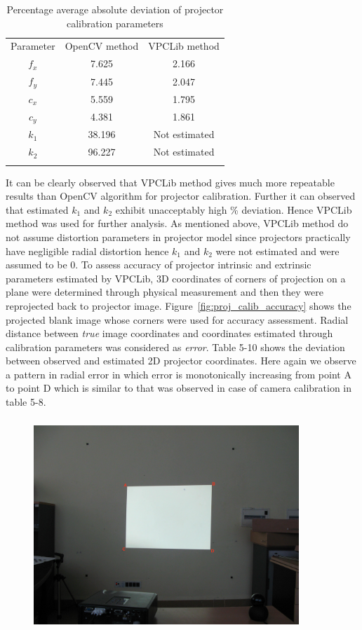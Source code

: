 \begin{enumerate}
\begin{table}[ht]
\centering
\begin{tabular}{c c c}
\hline\noalign{\smallskip}
Parameter  & OpenCV method & VPCLib method \\
\noalign{\smallskip}\hline\noalign{\smallskip}
$f_x$ & 7.625 & 2.166\\
$f_y$ & 7.445 & 2.047\\
$c_x$ & 5.559 & 1.795\\
$c_y$ & 4.381 & 1.861\\
$k_1$ & 38.196 & Not estimated\\
$k_2$ & 96.227 & Not estimated\\
\noalign{\smallskip}\hline
\end{tabular}
\caption{Percentage average absolute deviation of projector calibration parameters}
\end{table}
It can be clearly observed that VPCLib method gives much more repeatable results than OpenCV algorithm for projector calibration. Further it can observed that estimated $k_1$ and $k_2$ exhibit unacceptably high \% deviation. Hence VPCLib method was used for further analysis.\newline
\indent
As mentioned above, VPCLib method do not assume distortion parameters in projector model since projectors practically have negligible radial distortion hence $k_1$ and $k_2$ were not estimated and were assumed to be 0.\newline
To assess accuracy of projector intrinsic and extrinsic parameters estimated by VPCLib, 3D coordinates of corners of projection on a plane were determined through physical measurement and then they were reprojected back to projector image. Figure~\ref{fig:proj_calib_accuracy} shows the projected blank image whose corners were used for accuracy assessment. Radial distance between \textit{true} image coordinates and coordinates estimated through calibration parameters was considered as \textit{error}. Table 5-10 shows the deviation between observed and estimated 2D projector coordinates. Here again we observe a pattern in radial error in which error is monotonically increasing from point A to point D which is similar to that was observed in case of camera calibration in table 5-8.
\begin{figure}
\centering
\includegraphics[width=10cm,height=8cm]{../img_source/proj_calib_test.jpg}

\end{figure}
\end{enumerate}
